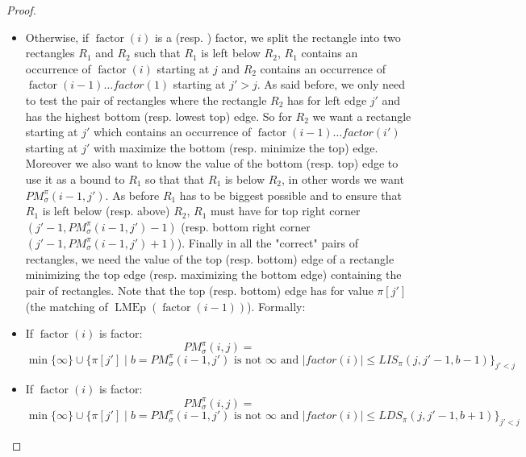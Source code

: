 \documentclass[a4paper]{llncs}
\newcommand{\RLMin}{\text{RLMin}}
\newcommand{\RLMax}{\text{RLMax}}
\newcommand{\ptext}{\pi}
\newcommand{\PM}{PM}
\DeclareMathOperator{\LMEi}{LMEp}
\DeclareMathOperator{\factor}{factor}
\begin{document}
\begin{proof}
\begin{itemize}
\item Otherwise, if $\factor(i)$ is a \RLMin (resp. \RLMax) factor,
 we split the rectangle into two rectangles $R_1$ and
$R_2$ such that $R_1$ is left below $R_2$,
$R_1$ contains an occurrence of $\factor(i)$ starting at
$j$
and $R_2$ contains an occurrence of $\factor(i-1) \ldots factor(1)$
starting at $j'>j$.
As said before, we only need to test the pair of rectangles
where the rectangle $R_2$ has for left edge $j'$
and has the highest bottom (resp. lowest top) edge.
So for $R_2$ we want
a rectangle starting at $j'$
which contains an occurrence of $\factor(i-1) \ldots factor(i')$
starting at $j'$
with maximize the bottom (resp. minimize the top) edge.
Moreover we also want to know the value of the bottom (resp. top) edge to use it as a bound to $R_1$ so that
that $R_1$ is below $R_2$,
in other words we want $\PM^\pi_\sigma(i-1,j')$.
As before $R_1$ has to be biggest possible and
to ensure that $R_1$ is left below (resp. above) $R_2$,
$R_1$ must have for top right corner $(j'-1, \PM^\pi_\sigma(i-1,j')-1 )$
(resp. bottom right corner $(j'-1, \PM^\pi_\sigma(i-1,j')+1 )$).
Finally in all the "correct" pairs of rectangles,
we need the value of the top (resp. bottom) edge of a rectangle minimizing the top edge (resp. maximizing the bottom edge)
containing the pair of rectangles. Note that the top (resp. bottom) edge has for value $\pi[j']$
(the matching of  $\LMEi(\factor(i-1))$). Formally:

\item If $\factor(i)$ is \RLMin factor:\\
$$
\PM^\pi_\sigma(i,j) =
$$
$
\min \{\infty\} \cup \{ \pi[j'] \mid b=\PM^\pi_\sigma(i-1,j') \text{ is not $\infty$ and }
 |factor(i)| \leq LIS_{\ptext}(j,j'-1,b-1) \}_{j' < j}
$

\item If $\factor(i)$ is \RLMax factor:\\
$$
\PM^\pi_\sigma(i,j) =
$$
$
\min \{\infty\} \cup \{ \pi[j'] \mid b=\PM^\pi_\sigma(i-1,j') \text{ is not $\infty$ and }
|factor(i)| \leq LDS_{\ptext}(j,j'-1,b+1) \}_{j' < j}
$




\end{itemize}


\end{proof}
\end{document}
